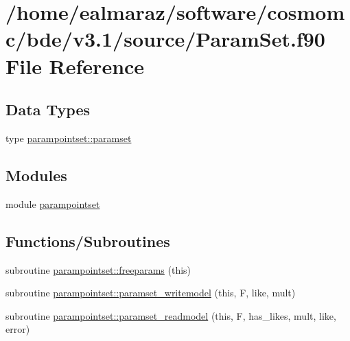 \hypertarget{ParamSet_8f90}{}\section{/home/ealmaraz/software/cosmomc/bde/v3.1/source/\+Param\+Set.f90 File Reference}
\label{ParamSet_8f90}
\subsection*{Data Types}
\begin{DoxyCompactItemize}
\item 
type \mbox{\hyperlink{structparampointset_1_1paramset}{parampointset\+::paramset}}
\end{DoxyCompactItemize}
\subsection*{Modules}
\begin{DoxyCompactItemize}
\item 
module \mbox{\hyperlink{namespaceparampointset}{parampointset}}
\end{DoxyCompactItemize}
\subsection*{Functions/\+Subroutines}
\begin{DoxyCompactItemize}
\item 
subroutine \mbox{\hyperlink{namespaceparampointset_a4403c38deb2c08ca00d3629b211eaeae}{parampointset\+::freeparams}} (this)
\item 
subroutine \mbox{\hyperlink{namespaceparampointset_ab3c28fc8a1787822aeec7c139ae0ff5a}{parampointset\+::paramset\+\_\+writemodel}} (this, F, like, mult)
\item 
subroutine \mbox{\hyperlink{namespaceparampointset_a41f49e842311c3c0441a2e7a36914a40}{parampointset\+::paramset\+\_\+readmodel}} (this, F, has\+\_\+likes, mult, like, error)
\end{DoxyCompactItemize}
